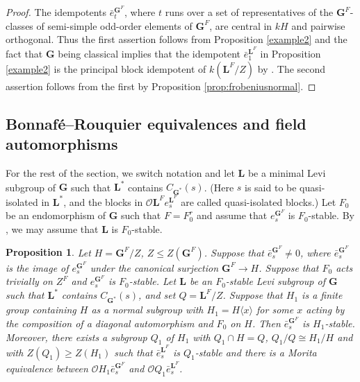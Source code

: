 \documentclass{amsart}
\theoremstyle{plain}\newtheorem{Theorem}{Theorem}[section]
\theoremstyle{plain}\newtheorem{Conjecture}[Theorem]{Conjecture}
\theoremstyle{plain}\newtheorem{Corollary}[Theorem]{Corollary}
\theoremstyle{plain}\newtheorem{Lemma}[Theorem]{Lemma}
\theoremstyle{plain}\newtheorem{Proposition}[Theorem]{Proposition}
\theoremstyle{definition}\newtheorem{Definition}[Theorem]{Definition}
\theoremstyle{definition}\newtheorem{Example}[Theorem]{Example}
\theoremstyle{definition}\newtheorem{Examples}[Theorem]{Examples}
\theoremstyle{definition}\newtheorem{Exercise}[Theorem]{Exercise}
\theoremstyle{definition}\newtheorem{Notation}[Theorem]{Notation}
\theoremstyle{definition}\newtheorem{Remark}[Theorem]{Remark}
\theoremstyle{definition}\newtheorem{Remarks}[Theorem]{Remarks}
\def\CO{{\mathcal{O}}}    \def\OPE{{\mathcal{O}(P\rtimes E)}}
\newcommand{\bG}{{\mathbf{G}}}
\newcommand{\bL}{{\mathbf{L}}}
\numberwithin{equation}{section}
\begin{document}
\begin{proof}    The  idempotents  $\bar e_t^{\bG^F}$,  where $t$  runs over a  set of representatives  of  the $\bG^F$-classes of  semi-simple odd-order elements of $\bG^F$,  are central in $kH$  and pairwise orthogonal.  Thus the first assertion follows from Proposition \ref{example2}   and the fact that $\bG$  being classical implies that    the idempotent  $\bar e_1^{\bL^F}$  in   Proposition \ref{example2}  is the principal block idempotent  of $k(\bL^F/Z)$ by \cite[Thm.~21.14]{CaEnbook}.
The  second assertion  follows  from the first by Proposition \ref{prop:frobeniusnormal}.
   \end{proof}  




\subsection{Bonnaf\'e--Rouquier equivalences and field automorphisms}\label{subsec:extenfield} For the rest of the section,   we switch notation  and   let $\bL $  be   a minimal   Levi subgroup of $\bG$  such that $\bL^*$  contains $C_{\bG^*}(s)$. (Here $s$ is said to be quasi-isolated in $\bL^\ast$, and the blocks in $\CO \bL^Fe_s^{\bL^F}$ are called quasi-isolated blocks.)   Let $F_0$  be an  endomorphism of $\bG$ such that   $F =F_0^r$  and  assume that  $e_s^{\bG^F} $  is   $F_0$-stable.  By \cite[Lem.~4.6]{Ru22}, we may assume that $\bL$ is  $F_0$-stable.

\begin{Proposition}    Let   $H  =\bG^F/Z$,  $Z \leq  Z(\bG^F)$.  Suppose that $\bar e_s^{\bG^F}  \ne 0$, where $\bar e_s^{\bG^F}$  is  the   image of   $e_s^{\bG^F} $  under the canonical surjection $\bG^F \to H $.  Suppose that  $F_0$ acts trivially  on $Z^F$ and   $e_s^{\bG^F} $ is   $F_0$-stable. Let $\bL $ be  an    $F_0$-stable Levi subgroup of $\bG$  such that $\bL^*$  contains $C_{\bG^*}(s)$, and set $Q= \bL^F/Z$. Suppose that  $H_1 $ is a  finite group  containing $H$ as a normal subgroup with $H_1= H \langle x\rangle $  for some $x$ acting by  the  composition of  a diagonal   automorphism  and $F_0$  on  $H$.
 Then $\bar  e_s^{\bG^F} $  is  $H_1$-stable. Moreover,
there exists 
 a  subgroup $Q_1 $  of $H_1 $  with $ Q_1 \cap H  =Q  $,  $Q_1/Q \cong  H_1/H$   and with  $Z(Q_1) \geq  Z(H_1) $   such that $\bar e_s^{\bL^F}$ is $Q_1$-stable  and  there is a Morita equivalence between $\CO H_1\bar e_{s}^{\bG^F}$ and $\CO Q_1 \bar e_{s}^{\bL^F}$.  
  \end{Proposition} 
\end{document}
